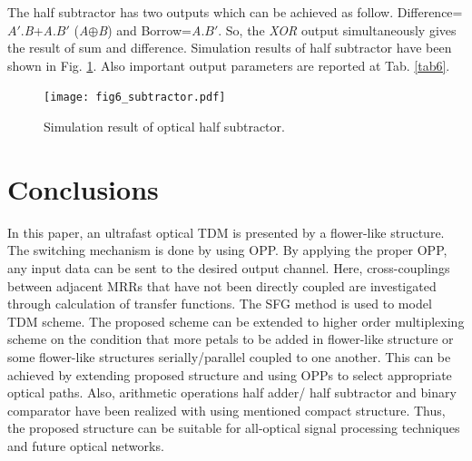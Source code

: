 \documentclass{osa-article}
\begin{document}
The half subtractor has two outputs which can be achieved as follow. Difference=$A'$.\textit {B}+\textit {A}.$B'$ (\textit {A}$\oplus$\textit {B}) and Borrow=\textit {A}.$B'$. So, the \textit{XOR} output simultaneously gives the result of sum and difference. Simulation results of half subtractor have been shown in Fig. \ref{fig6_subtractor}. Also important output parameters are reported at Tab. \ref{tab6}.
   \begin{figure}[tb]
\centering
\texttt{[image: fig6\_subtractor.pdf]}
	\caption{Simulation result of optical half subtractor.}
	\label{fig6_subtractor}
\end{figure}

\begin{table}[H]
\caption{The parameters of flower-like structure  as half subtractor.}
\centering 
{}
\label{tab6} %
\end{table}

\section{Conclusions}
\label{}
In this paper, an ultrafast optical TDM is presented by a flower-like structure. The switching mechanism is done by using OPP. By applying the proper OPP, any input data can be sent to the desired output channel. Here, cross-couplings between adjacent MRRs that have not been directly coupled are investigated through calculation of transfer functions. The SFG method is used to model TDM scheme. The proposed scheme can be extended to higher order multiplexing scheme on the condition that more petals to be added in flower-like structure or some flower-like structures serially/parallel coupled to one another. This can be achieved by extending proposed structure and using OPPs to select appropriate optical paths. Also, arithmetic operations half adder/ half subtractor and binary comparator have been realized with using mentioned compact structure. Thus, the proposed structure can be suitable for all-optical signal processing techniques and future optical networks.
\end{document}
